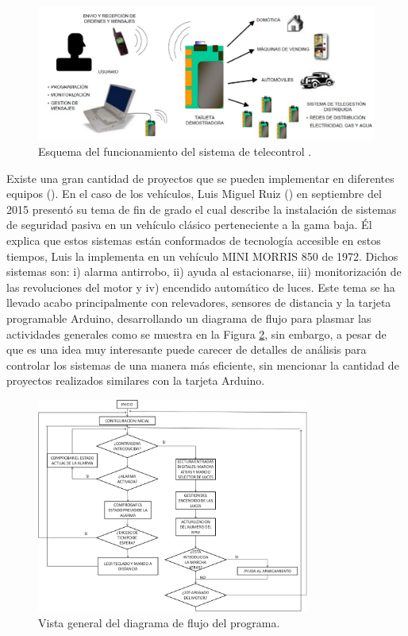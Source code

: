 %
\begin{figure}[H]
\centering
\includegraphics[width=1\textwidth]{introduccion/fig3.jpg}
\caption{Esquema del funcionamiento del sistema de telecontrol \cite{UPS-05}. }
\label{Ftres}
\end{figure}
%

Existe una gran cantidad de proyectos que se pueden implementar en diferentes equipos (\cite{UPS-05,UPS-06}). En el caso de los vehículos, Luis Miguel Ruiz (\cite{UPS-06}) en septiembre del 2015 presentó su tema de fin de grado el cual describe la instalación de sistemas de seguridad pasiva en un vehículo clásico perteneciente a la gama baja. Él explica que estos sistemas están conformados de tecnología accesible en estos tiempos, Luis la implementa en un vehículo MINI MORRIS 850 de 1972. Dichos sistemas son: i) alarma antirrobo, ii) ayuda al estacionarse, iii) monitorización de las revoluciones del motor y iv) encendido automático de luces. Este tema se ha llevado acabo principalmente con relevadores, sensores de distancia y la tarjeta programable Arduino, desarrollando un diagrama de flujo para plasmar las actividades generales como se muestra en la Figura \ref{Ftresdos}, sin embargo, a pesar de que es una idea muy interesante puede carecer de detalles de análisis para controlar los sistemas de una manera más eficiente, sin mencionar la cantidad de proyectos realizados similares con la tarjeta Arduino.\\

%
\begin{figure}[H]
\centering
\includegraphics[width=0.8\textwidth]{introduccion/fig5.jpg}
\caption{Vista general del diagrama de flujo del programa. }
\label{Ftresdos}
\end{figure}
%

